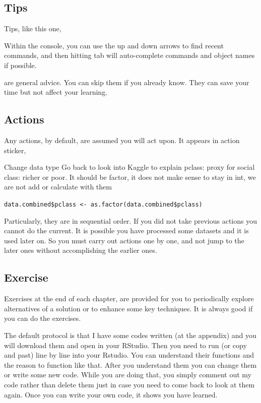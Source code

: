 \documentclass[
]{book}
\makeatletter
\newenvironment{kframe}{%
\medskip{}
\setlength{\fboxsep}{.8em}
 \def\at@end@of@kframe{}%
 \ifinner\ifhmode%
  \def\at@end@of@kframe{\end{minipage}}%
  \begin{minipage}{\columnwidth}%
 \fi\fi%
 \def\FrameCommand##1{\hskip\@totalleftmargin \hskip-\fboxsep
 \colorbox{shadecolor}{##1}\hskip-\fboxsep
     \hskip-\linewidth \hskip-\@totalleftmargin \hskip\columnwidth}%
 \MakeFramed {\advance\hsize-\width
   \@totalleftmargin\z@ \linewidth\hsize
   \@setminipage}}%
 {\par\unskip\endMakeFramed%
 \at@end@of@kframe}
\newenvironment{rmdblock}[1]
  {
  \begin{itemize}
  \renewcommand{\labelitemi}{
    \raisebox{-.7\height}[0pt][0pt]{
      {\setkeys{Gin}{width=3em,keepaspectratio}\texttt{[image: images/\#1]}}
    }
  }
  \setlength{\fboxsep}{1em}
  \begin{kframe}
  \item
  }
  {
  \end{kframe}
  \end{itemize}
  }
\newenvironment{rmdaction}
  {\begin{rmdblock}{action}}
  {\end{rmdblock}}
\newenvironment{rmdtip}
  {\begin{rmdblock}{tip}}
  {\end{rmdblock}}
\makeatother
\begin{document}
\hypertarget{tips}{%
\subsection*{Tips}\label{tips}}


Tips, like this one,

\begin{rmdtip}
Within the console, you can use the up and down arrows to find recent commands, and then hitting tab will auto-complete commands and object names if possible.
\end{rmdtip}

are general advice. You can skip them if you already know. They can save your time but not affect your learning.

\hypertarget{actions}{%
\subsection*{Actions}\label{actions}}


Any actions, by default, are assumed you will act upon. It appears in action sticker,

\begin{rmdaction}
Change data type
Go back to look into Kaggle to explain pclass: proxy for social class: richer or poor. It should be factor, it does not make sense to stay in int, we are not add or calculate with them

\texttt{data.combined\$pclass\ \textless{}-\ as.factor(data.combined\$pclass)}
\end{rmdaction}

Particularly, they are in sequential order. If you did not take previous actions you cannot do the current. It is possible you have processed some datasets and it is used later on. So you must carry out actions one by one, and not jump to the later ones without accomplishing the earlier ones.

\hypertarget{exercise}{%
\subsection*{Exercise}\label{exercise}}


Exercises at the end of each chapter, are provided for you to periodically explore alternatives of a solution or to enhance some key techniques. It is always good if you can do the exercises.

The default protocol is that I have some codes written (at the appendix) and you will download them and open in your RStudio. Then you need to run (or copy and past) line by line into your Rstudio. You can understand their functions and the reason to function like that. After you understand them you can change them or write some new code. While you are doing that, you simply comment out my code rather than delete them just in case you need to come back to look at them again. Once you can write your own code, it shows you have learned.
\end{document}
